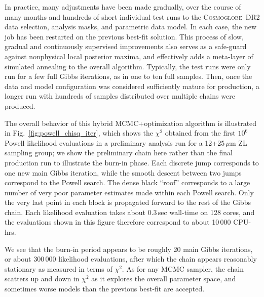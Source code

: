 \documentclass[twocolumn]{aa}
\newcommand{\cosmoglobe}{\textsc{Cosmoglobe}}
\begin{document}
In practice, many adjustments have been made gradually, over the course
of many months and hundreds of short individual test runs to the
\cosmoglobe\ DR2 data selection, analysis masks, and parametric data
model. In each case, the new job has been restarted on the previous
best-fit solution. This process of slow, gradual and continuously
supervised improvements also serves as a safe-guard against nonphysical
local posterior maxima, and effectively adds a meta-layer of simulated
annealing to the overall algorithm. Typically, the test runs were only
run for a few full Gibbs iterations, as in one to ten full
samples. Then, once the data and model configuration was considered
sufficiently mature for production, a longer run with hundreds of
samples distributed over multiple chains were produced.


The overall behavior of this hybrid MCMC+optimization algorithm is
illustrated in Fig.~\ref{fig:powell_chisq_iter}, which shows the
$\chi^2$ obtained from the first $10^6$ Powell likelihood evaluations
in a preliminary analysis run for a 12+25\,$\mu$m ZL sampling
group; we show the preliminary chain here rather than the final
production run to illustrate the burn-in phase. Each discrete jump
corresponds to one new main Gibbs iteration, while the smooth descent
between two jumps correspond to the Powell search. The dense black
``roof'' corresponds to a large number of very poor parameter
estimates made within each Powell search. Only the very last point in
each block is propagated forward to the rest of the Gibbs chain. Each
likelihood evaluation takes about 0.3\,sec wall-time on 128 cores, and
the evaluations shown in this figure therefore correspond to about
10\,000 CPU-hrs.

We see that the burn-in period appears to be roughly 20 main Gibbs
iterations, or about 300\,000 likelihood evaluations, after which the
chain appears reasonably stationary as measured in terms of
$\chi^2$. As for any MCMC sampler, the chain scatters up and down in
$\chi^2$ as it explores the overall parameter space, and sometimes
worse models than the previous best-fit are accepted.
\end{document}
